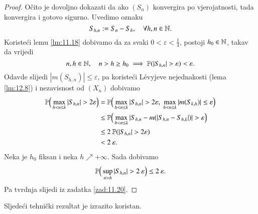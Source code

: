 \begin{proof}
    O\v cito je dovoljno dokazati da ako $(S_n)$ konvergira po vjerojatnosti, tada konvergira i gotovo sigurno.
    Uvedimo oznaku
    \begin{equation*}
        S_{h, n} := S_n - S_h, \quad \forall h, n \in \mathbb{N}.
    \end{equation*}
    Koriste\' ci lemu \ref{lm:11.18} dobivamo da za svaki $0 < \varepsilon < \frac{1}{4}$, postoji $h_0 \in \mathbb{N}$, takav da vrijedi
    \begin{equation*}
        n, h \in \mathbb{N}, \quad n > h \geq h_0 \implies \mathbb{P}({|S_{h, n}| > \varepsilon}) < \varepsilon.
    \end{equation*}
    Odavde slijedi $|m(S_{h, n})| \leq \varepsilon$, pa koriste\' ci L\' evyjeve nejednakosti (lema \ref{lm:12.8}) i nezavisnost od $(X_n)$ dobivamo
    \begin{equation*}
        \begin{aligned}
            \mathbb{P} \Big( \max\limits_{h < n \leq k} |S_{h, n}| > 2 \varepsilon \Big) &= \mathbb{P} \Big( \max\limits_{h < n \leq k} |S_{h, n}| > 2 \varepsilon, \; \max\limits_{h < n \leq k} |m(S_{k, h})| \leq \varepsilon \Big)\\
            &\leq \mathbb{P} \Big( \max\limits_{h < n \leq k} |S_{h, n} - m(|S_{h, n} - S_{h, k}|)| > \varepsilon \Big)\\
            &\leq 2 \: \mathbb{P}({|S_{h, n}| > 2 \varepsilon})\\
            &< 2 \: \varepsilon. 
        \end{aligned}
    \end{equation*}
    Neka je $h_0$ fiksan i neka $h \nearrow +\infty$.
    Sada dobivamo
    \begin{equation*}
        \mathbb{P} \Big( \sup\limits_{n > h} |S_{h, n}| > 2 \: \varepsilon \Big) \leq 2 \: \varepsilon.
    \end{equation*}
    Pa tvrdnja slijedi iz zadatka \ref{zad:11.20}.
\end{proof}

Sljede\' ci tehni\v cki rezultat je izrazito koristan.

